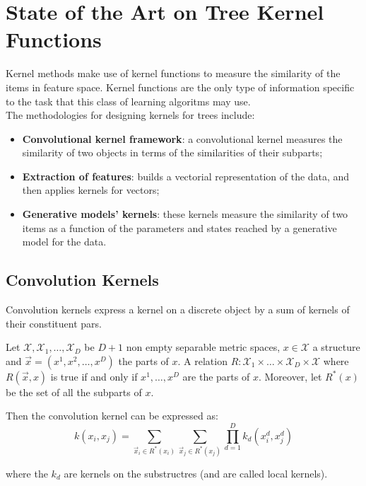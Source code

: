 \section{State of the Art on Tree Kernel Functions}

Kernel methods make use of kernel functions to measure the similarity of the
items in feature space. Kernel functions are the only type of information
specific to the task that this class of learning algoritms may use.\\
The methodologies for designing kernels for trees include:
\begin{itemize}
	\item \textbf{Convolutional kernel framework}: a convolutional kernel
		measures the similarity of two objects in terms of the similarities of 
		their subparts;

	\item \textbf{Extraction of features}: builds a vectorial representation of
		the data, and then applies kernels for vectors;

	\item \textbf{Generative models' kernels}: these kernels measure the
		similarity of two items as a function of the parameters and states
		reached by a generative model for the data.
\end{itemize}

\subsection{Convolution Kernels}

Convolution kernels express a kernel on a discrete object by a sum of kernels of
their constituent pars.

\begin{definition}
Let $\mathcal{X}, \mathcal{X}_1, \dots, \mathcal{X}_D$ be $D + 1$ non empty
separable metric spaces, 
$x \in \mathcal{X}$ a structure and $\vec{x} = (x^1, x^2, \dots, x^D)$
the parts of $x$. 
A relation 
$R: \mathcal{X}_1 \times \dots \times \mathcal{X}_D \times \mathcal{X}$ 
where $R(\vec{x},x)$ is true if and only if $x^1, \dots, x^D$ are the 
parts of $x$. 
Moreover, let $R^*(x)$ be the set of all the subparts of $x$.

Then the convolution kernel can be expressed as:
\begin{equation}
	k(x_i, x_j) = 
	\sum_{\vec{x}_i \in R^*(x_i)} 
	\sum_{\vec{x}_j \in R^*(x_j)} 
	\prod_{d=1}^D k_d(x_i^d, x_j^d)
\end{equation}

where the $k_d$ are kernels on the substructres (and are called local kernels).
\end{definition}

